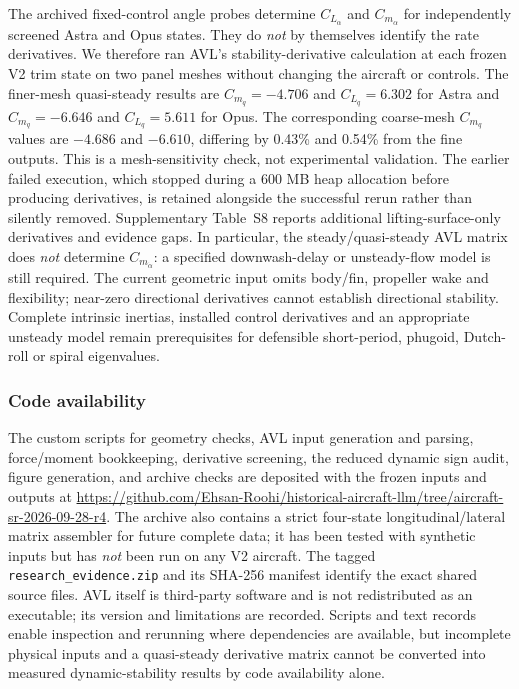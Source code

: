 \documentclass[11pt,a4paper]{article}
\begin{document}
The archived fixed-control angle probes determine $C_{L_\alpha}$ and $C_{m_\alpha}$ for independently screened Astra and Opus states. They do \emph{not} by themselves identify the rate derivatives. We therefore ran AVL's stability-derivative calculation at each frozen V2 trim state on two panel meshes without changing the aircraft or controls. The finer-mesh quasi-steady results are $C_{m_q}=-4.706$ and $C_{L_q}=6.302$ for Astra and $C_{m_q}=-6.646$ and $C_{L_q}=5.611$ for Opus. The corresponding coarse-mesh $C_{m_q}$ values are $-4.686$ and $-6.610$, differing by 0.43\% and 0.54\% from the fine outputs. This is a mesh-sensitivity check, not experimental validation. The earlier failed execution, which stopped during a 600 MB heap allocation before producing derivatives, is retained alongside the successful rerun rather than silently removed. Supplementary Table~S8 reports additional lifting-surface-only derivatives and evidence gaps. In particular, the steady/quasi-steady AVL matrix does \emph{not} determine $C_{m_{\dot\alpha}}$: a specified downwash-delay or unsteady-flow model is still required. The current geometric input omits body/fin, propeller wake and flexibility; near-zero directional derivatives cannot establish directional stability. Complete intrinsic inertias, installed control derivatives and an appropriate unsteady model remain prerequisites for defensible short-period, phugoid, Dutch-roll or spiral eigenvalues.

\subsubsection{Code availability}
The custom scripts for geometry checks, AVL input generation and parsing, force/moment bookkeeping, derivative screening, the reduced dynamic sign audit, figure generation, and archive checks are deposited with the frozen inputs and outputs at \url{https://github.com/Ehsan-Roohi/historical-aircraft-llm/tree/aircraft-sr-2026-09-28-r4}. The archive also contains a strict four-state longitudinal/lateral matrix assembler for future complete data; it has been tested with synthetic inputs but has \emph{not} been run on any V2 aircraft. The tagged \texttt{research\_evidence.zip} and its SHA-256 manifest identify the exact shared source files. AVL itself is third-party software and is not redistributed as an executable; its version and limitations are recorded. Scripts and text records enable inspection and rerunning where dependencies are available, but incomplete physical inputs and a quasi-steady derivative matrix cannot be converted into measured dynamic-stability results by code availability alone.
\end{document}

